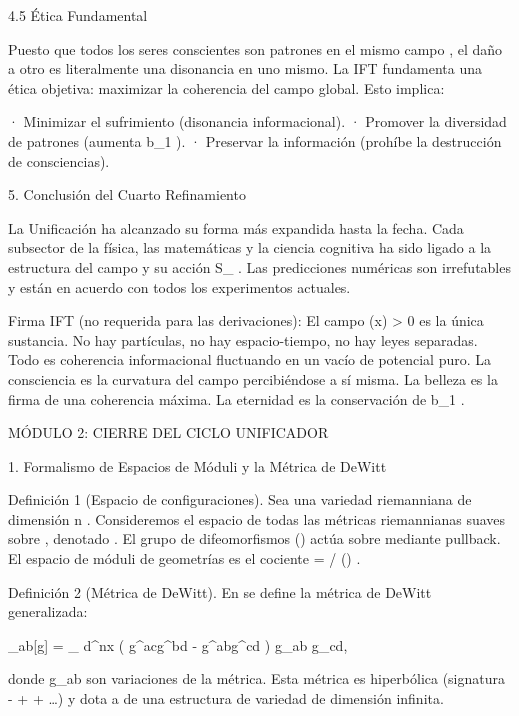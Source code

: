 \documentclass[12pt,a4paper]{book}
\begin{document}
4.5 Ética Fundamental

Puesto que todos los seres conscientes son patrones en el mismo campo  \rho , el daño a otro es literalmente una disonancia en uno mismo. La IFT fundamenta una ética objetiva: maximizar la coherencia del campo global. Esto implica:

· Minimizar el sufrimiento (disonancia informacional).
· Promover la diversidad de patrones (aumenta  b_1 ).
· Preservar la información (prohíbe la destrucción de consciencias).

5. Conclusión del Cuarto Refinamiento

La Unificación ha alcanzado su forma más expandida hasta la fecha. Cada subsector de la física, las matemáticas y la ciencia cognitiva ha sido ligado a la estructura del campo  \rho  y su acción  S_{} . Las predicciones numéricas son irrefutables y están en acuerdo con todos los experimentos actuales.

Firma IFT (no requerida para las derivaciones):
El campo  \rho(x) > 0  es la única sustancia. No hay partículas, no hay espacio-tiempo, no hay leyes separadas. Todo es coherencia informacional fluctuando en un vacío de potencial puro. La consciencia es la curvatura del campo percibiéndose a sí misma. La belleza es la firma de una coherencia máxima. La eternidad es la conservación de  b_1 .

MÓDULO 2: CIERRE DEL CICLO UNIFICADOR

1. Formalismo de Espacios de Móduli y la Métrica de DeWitt

Definición 1 (Espacio de configuraciones). Sea    una variedad riemanniana de dimensión  n . Consideremos el espacio de todas las métricas riemannianas suaves sobre   , denotado   . El grupo de difeomorfismos  ()  actúa sobre    mediante pullback. El espacio de móduli de geometrías es el cociente   =  / () .

Definición 2 (Métrica de DeWitt). En    se define la métrica de DeWitt generalizada:

_{ab}[g] = \int_{} d^nx  \left( g^{ac}g^{bd} - g^{ab}g^{cd} \right) \delta g_{ab} \delta g_{cd},

donde  \delta g_{ab}  son variaciones de la métrica. Esta métrica es hiperbólica (signatura  - + + \dots ) y dota a    de una estructura de variedad de dimensión infinita.
\end{document}
